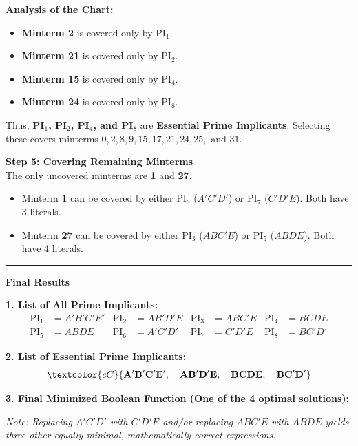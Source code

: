 \documentclass[12pt,a3paper]{article}
\begin{document}
\begin{enumerate}
\begin{tcolorbox}[enhanced,breakable,ansbox,colback=cC!4,colframe=cC,boxrule=0.8pt,arc=5pt,title={\textbf{Answer}},fonttitle=\bfseries\color{white},colbacktitle=cC]
\vspace{0.5em}
\textbf{Analysis of the Chart:}
\begin{itemize}
    \item \textbf{Minterm 2} is covered only by PI$_1$.
    \item \textbf{Minterm 21} is covered only by PI$_2$.
    \item \textbf{Minterm 15} is covered only by PI$_4$.
    \item \textbf{Minterm 24} is covered only by PI$_8$.
\end{itemize}
Thus, \textcolor{cC}{\textbf{PI$_1$, PI$_2$, PI$_4$, and PI$_8$}} are \textbf{Essential Prime Implicants}. Selecting these covers minterms $0, 2, 8, 9, 15, 17, 21, 24, 25, \text{ and } 31$.

\vspace{0.5em}
\textbf{\large Step 5: Covering Remaining Minterms} \\
The only uncovered minterms are \textbf{1} and \textbf{27}.
\begin{itemize}
    \item Minterm \textbf{1} can be covered by either PI$_6$ ($A'C'D'$) or PI$_7$ ($C'D'E$). Both have 3 literals.
    \item Minterm \textbf{27} can be covered by either PI$_3$ ($ABC'E$) or PI$_5$ ($ABDE$). Both have 4 literals.
\end{itemize}

\vspace{1em}
\rule{\textwidth}{0.4pt}
\vspace{1em}

\textbf{\large Final Results}

\textbf{1. List of All Prime Implicants:}
\begin{align*}
    \text{PI}_1 &= A'B'C'E' & \text{PI}_2 &= AB'D'E & \text{PI}_3 &= ABC'E & \text{PI}_4 &= BCDE \\
    \text{PI}_5 &= ABDE & \text{PI}_6 &= A'C'D' & \text{PI}_7 &= C'D'E & \text{PI}_8 &= BC'D'
\end{align*}

\textbf{2. List of Essential Prime Implicants:}
\[ \textcolor{cC}{\mathbf{A'B'C'E', \quad AB'D'E, \quad BCDE, \quad BC'D'}} \]

\textbf{3. Final Minimized Boolean Function (One of the 4 optimal solutions):}
\begin{center}
\end{center}
\textit{Note: Replacing $A'C'D'$ with $C'D'E$ and/or replacing $ABC'E$ with $ABDE$ yields three other equally minimal, mathematically correct expressions.}


\end{tcolorbox}
\end{enumerate}
\end{document}
